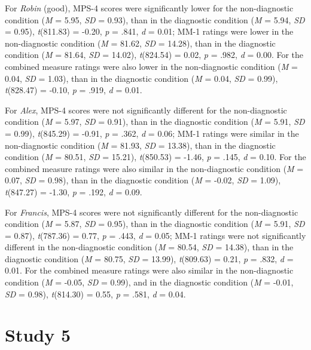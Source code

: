 \documentclass[
  american,
  man,mask,floatsintext]{apa6}
\begin{document}
For \emph{Robin} (good), MPS-4 scores were significantly lower for the non-diagnostic condition (\emph{M} = 5.95, \emph{SD} = 0.93), than in the diagnostic condition (\emph{M} = 5.94, \emph{SD} = 0.95), \emph{t}(811.83) = -0.20, \emph{p} = .841, \emph{d} = 0.01; MM-1 ratings were lower in the non-diagnostic condition (\emph{M} = 81.62, \emph{SD} = 14.28), than in the diagnostic condition (\emph{M} = 81.64, \emph{SD} = 14.02), \emph{t}(824.54) = 0.02, \emph{p} = .982, \emph{d} = 0.00. For the combined measure ratings were also lower in the non-diagnostic condition (\emph{M} = 0.04, \emph{SD} = 1.03), than in the diagnostic condition (\emph{M} = 0.04, \emph{SD} = 0.99), \emph{t}(828.47) = -0.10, \emph{p} = .919, \emph{d} = 0.01.

For \emph{Alex}, MPS-4 scores were not significantly different for the non-diagnostic condition (\emph{M} = 5.97, \emph{SD} = 0.91), than in the diagnostic condition (\emph{M} = 5.91, \emph{SD} = 0.99), \emph{t}(845.29) = -0.91, \emph{p} = .362, \emph{d} = 0.06; MM-1 ratings were similar in the non-diagnostic condition (\emph{M} = 81.93, \emph{SD} = 13.38), than in the diagnostic condition (\emph{M} = 80.51, \emph{SD} = 15.21), \emph{t}(850.53) = -1.46, \emph{p} = .145, \emph{d} = 0.10. For the combined measure ratings were also similar in the non-diagnostic condition (\emph{M} = 0.07, \emph{SD} = 0.98), than in the diagnostic condition (\emph{M} = -0.02, \emph{SD} = 1.09), \emph{t}(847.27) = -1.30, \emph{p} = .192, \emph{d} = 0.09.

For \emph{Francis}, MPS-4 scores were not significantly different for the non-diagnostic condition (\emph{M} = 5.87, \emph{SD} = 0.95), than in the diagnostic condition (\emph{M} = 5.91, \emph{SD} = 0.87), \emph{t}(787.36) = 0.77, \emph{p} = .443, \emph{d} = 0.05; MM-1 ratings were not significantly different in the non-diagnostic condition (\emph{M} = 80.54, \emph{SD} = 14.38), than in the diagnostic condition (\emph{M} = 80.75, \emph{SD} = 13.99), \emph{t}(809.63) = 0.21, \emph{p} = .832, \emph{d} = 0.01. For the combined measure ratings were also similar in the non-diagnostic condition (\emph{M} = -0.05, \emph{SD} = 0.99), and in the diagnostic condition (\emph{M} = -0.01, \emph{SD} = 0.98), \emph{t}(814.30) = 0.55, \emph{p} = .581, \emph{d} = 0.04.

\hypertarget{study-5}{%
\section{Study 5}\label{study-5}}
\end{document}
